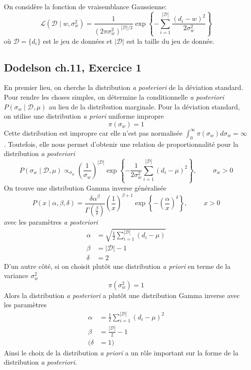 \documentclass{article}
\numberwithin{equation}{section}
\begin{document}
On considère la fonction de vraisemblance Gaussienne:
\[
        \mathcal{L}(\mathcal{D} \mid w, \sigma_w^2) 
        = \frac{1}{(2 \pi \sigma_w^2)^{|\mathcal{D}|/2}}
        \exp \left\{ -\sum_{i=1}^{|\mathcal{D}|}\frac{(d_i - w)^{2} }{2 \sigma_w^2} \right\}
\]
où $\mathcal{D} = \{d_i \}$ est le jeu de données et $|\mathcal{D}|$ est 
la taille du jeu de donnée.

\subsection{Dodelson ch.11, Exercice 1}
En premier lieu, on cherche la distribution \textit{a posteriori} de 
la déviation standard. Pour rendre les choses simples, on détermine 
la conditionnelle \textit{a posteriori} $P(\sigma_w \mid \mathcal{D}, \mu)$ 
au lieu de la distribution marginale. Pour la déviation standard, on 
utilise une distribution \textit{a priori} uniforme impropre
\[
        \pi(\sigma_w) = 1
\]
Cette distribution est impropre car elle n'est pas normalisée 
$\int_{0}^{\infty }\pi(\sigma_w) d\sigma_w = \infty $
. Toutefois, 
elle nous permet d'obtenir une relation de proportionnalité pour 
la distribution \textit{a posteriori} 
\[
        P(\sigma_w \mid \mathcal{D}, \mu) \propto_{\sigma_w}
        \left(\frac{1}{\sigma_w}  \right)^{|\mathcal{D}|} 
        \exp
        \left\{ -\frac{1}{2\sigma_w^2}\sum_{i=1}^{|\mathcal{D}|}
        (d_i - \mu)^{2}\right\}, \hspace{1cm} \sigma_w > 0
\]
On trouve une distribution Gamma inverse généralisée
\[
        P(x \mid \alpha, \beta, \delta ) = 
        \frac{\delta \alpha^{\beta}}{\Gamma(\frac{\beta}{\delta })} 
        \left(\frac{1}{x}\right)^{\beta + 1}
        \exp \left\{ - \left(\frac{\alpha}{x}\right)^{\delta } \right\}, \hspace{1cm} x > 0
\]
avec les paramètres \textit{a posteriori}
\begin{align*}
        \alpha &= \sqrt{\frac{1}{2}\sum_{i=1}^{|\mathcal{D}|}(d_i - \mu)} \\
        \beta &= |\mathcal{D}| - 1 \\
        \delta &= 2
\end{align*}
D'un autre côté, si on choisit plutôt une distribution \textit{a priori} en terme 
de la variance $\sigma_w^2$
\[
        \pi(\sigma_w^2) = 1
\]
Alors la distribution \textit{a posteriori} a plutôt une distribution Gamma inverse avec 
les paramètres
\begin{align*}
        \alpha &=  \frac{1}{2}\sum_{i = 1}^{|\mathcal{D}|} (d_i - \mu)^{2} \\
        \beta &= \frac{|\mathcal{D}|}{2} - 1 \\
        (\delta &=  1)
\end{align*}
Ainsi le choix de la distribution \textit{a priori} a un rôle important sur la forme de la  
distribution \textit{a posteriori}.
\end{document}

